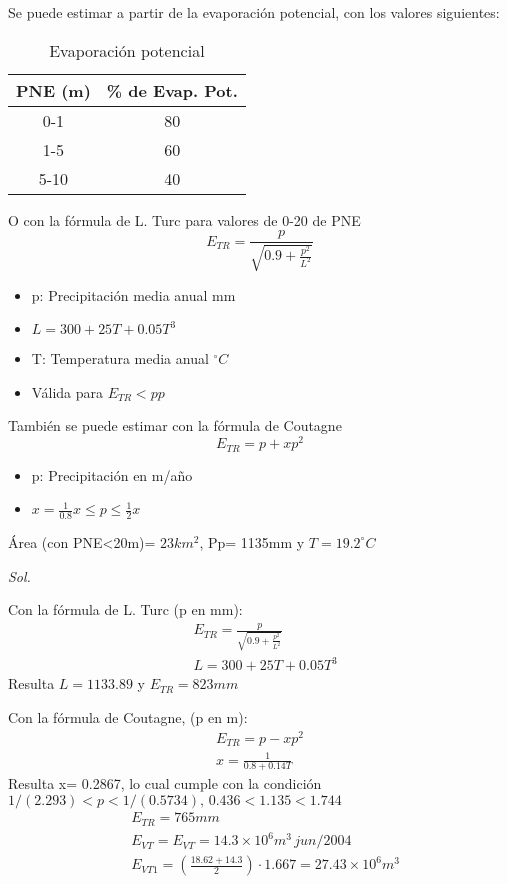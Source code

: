Se puede estimar a partir de la evaporación potencial, con los valores siguientes:
\begin{table}[h!]
    \centering
    \begin{tabular}{@{}cc@{}}
    \toprule
    PNE (m) & \% de Evap. Pot. \\ \midrule
    0-1     & 80               \\
    1-5     & 60               \\
    5-10    & 40               \\ \bottomrule
    \end{tabular}
    \caption{Evaporación potencial}
    \label{tabgh15}
\end{table}
O con la fórmula de L. Turc para valores de 0-20 de PNE
\begin{equation}
    E_{TR}= \frac{p}{\sqrt{0.9 + \frac{p^2}{L^2}}}
\end{equation}
\begin{notation}
    \begin{itemize}
        \item p: Precipitación media anual mm
        \item $L= 300+25T+ 0.05T^3$
        \item T: Temperatura media anual $^{\circ}C$
        \item Válida para $E_{TR}<pp$
    \end{itemize}
\end{notation}
También se puede estimar con la fórmula de Coutagne
\begin{equation}
    E_{TR} = p + xp^2
\end{equation}
\begin{itemize}
    \item p: Precipitación en m/año
    \item $x= \frac{1}{0.8}x\leq p\leq \frac{1}{2}x$
\end{itemize}
\begin{example}
    Área (con PNE<20m)= $23km^2$, Pp= 1135mm y $T=19.2^{\circ}C$

    \textit{ Sol. }

    Con la fórmula de L. Turc (p en mm):
    \begin{align*}
        &E_{TR}= \frac{p}{\sqrt{0.9 + \frac{p^2}{L^2}}}\\
        &L= 300+25T+ 0.05T^3
    \end{align*}
    Resulta $L=1133.89$ y $E_{TR}= 823mm$

    Con la fórmula de Coutagne, (p en m):
    \begin{align*}
        E_{TR} = p - xp^2\\
        x = \frac{1}{0.8 + 0.14T}
    \end{align*}
    Resulta x= 0.2867, lo cual cumple con la condición $1/(2.293)<p<1/(0.5734),\, 0.436<1.135<1.744$
    \begin{align*}
        &E_{TR}= 765mm\\
        &E_{VT}= E_{VT} = 14.3 \times 10^6 m^3\, jun / 2004\\
        &E_{VT1} = \left(\frac{18.62 + 14.3}{2}\right)  \cdot 1.667 = 27.43 \times 10^6 m^3
    \end{align*}
    
\end{example}
